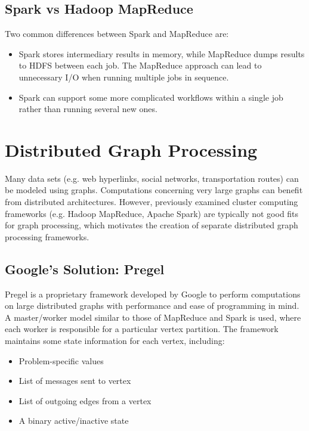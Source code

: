 \documentclass[12pt,titlepage]{article}
\begin{document}
    \subsection{Spark vs Hadoop MapReduce}
      Two common differences between Spark and MapReduce are:
      \begin{itemize}
        \item Spark stores intermediary results in memory, while MapReduce dumps results to HDFS between each job. The MapReduce approach can lead to unnecessary I/O
          when running multiple jobs in sequence.
        \item Spark can support some more complicated workflows within a single job rather than running several new ones.
      \end{itemize}

  \newpage

  \section{Distributed Graph Processing}
    Many data sets (e.g. web hyperlinks, social networks, transportation routes) can be modeled using graphs. Computations concerning very large graphs can benefit
    from distributed architectures. However, previously examined cluster computing frameworks (e.g. Hadoop MapReduce, Apache Spark) are typically not good fits for
    graph processing, which motivates the creation of separate distributed graph processing frameworks.

    \subsection{Google's Solution: Pregel}
      Pregel is a proprietary framework developed by Google to perform computations on large distributed graphs with performance and ease of programming in mind.
      A master/worker model similar to those of MapReduce and Spark is used, where each worker is responsible for a particular vertex partition. The framework
      maintains some state information for each vertex, including:
      \begin{itemize}
        \item Problem-specific values
        \item List of messages sent to vertex
        \item List of outgoing edges from a vertex
        \item A binary active/inactive state
      \end{itemize}
\end{document}
